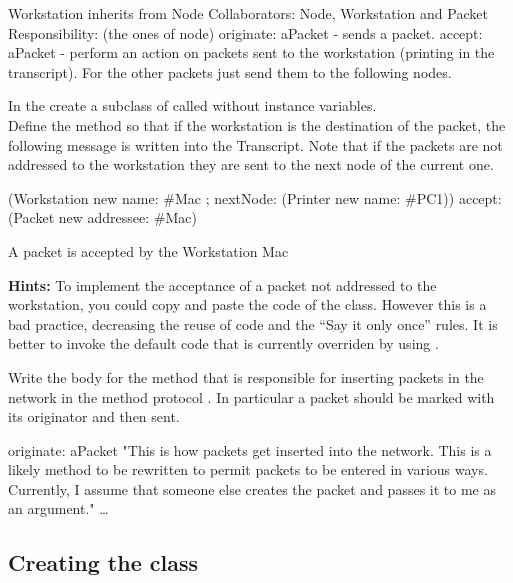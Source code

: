 \begin{scode}
Workstation inherits from Node
Collaborators: Node, Workstation
and Packet
Responsibility: (the ones of node)
originate: aPacket - sends a packet.
accept: aPacket - perform an action on packets sent to the
workstation (printing in the transcript). For the other
packets just send them to the following nodes.
\end{scode}

\exercise In the \category {} create a subclass of
called  without instance
variables. \\

\exercise  Define the method  so that if
the workstation is the destination of the packet, the following
message is written into the Transcript. Note that if the packets
are not addressed to the workstation they are sent to the next
node of the current one.

\begin{scode}
(Workstation new
    name: \#Mac ;
    nextNode: (Printer new name: \#PC1))
          accept: (Packet new addressee: \#Mac)

A packet is accepted by the Workstation Mac
\end{scode}

\textbf{Hints:} To implement the acceptance of a packet not addressed
to the workstation, you could copy and paste the code of the
 class. However this is a bad practice, decreasing
the reuse of code and the ``Say it only once'' rules. It is better
to invoke the default code that is currently overriden by using
.

\exercise  Write the body for the method  that
is responsible for inserting packets in the network in the method
protocol . In particular a packet should be
marked with its originator and then sent.

\begin{scode}
originate: aPacket
 "This is how packets get inserted into the network.
  This is a likely method to be rewritten to permit
  packets to be entered in various ways. Currently,
  I assume that someone else creates the packet and
  passes it to me as an argument."
 \ldots

\end{scode}

\subsection*{Creating the class }

